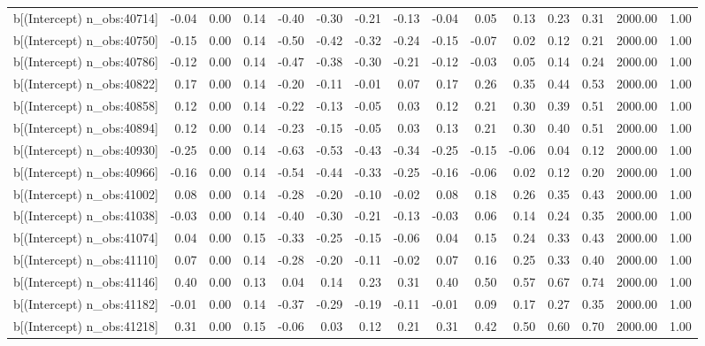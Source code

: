 \begin{table}[ht]
\begin{tabular}{rrrrrrrrrrrrrrr}
  b[(Intercept) n\_obs:40714] & -0.04 & 0.00 & 0.14 & -0.40 & -0.30 & -0.21 & -0.13 & -0.04 & 0.05 & 0.13 & 0.23 & 0.31 & 2000.00 & 1.00 \\ 
  b[(Intercept) n\_obs:40750] & -0.15 & 0.00 & 0.14 & -0.50 & -0.42 & -0.32 & -0.24 & -0.15 & -0.07 & 0.02 & 0.12 & 0.21 & 2000.00 & 1.00 \\ 
  b[(Intercept) n\_obs:40786] & -0.12 & 0.00 & 0.14 & -0.47 & -0.38 & -0.30 & -0.21 & -0.12 & -0.03 & 0.05 & 0.14 & 0.24 & 2000.00 & 1.00 \\ 
  b[(Intercept) n\_obs:40822] & 0.17 & 0.00 & 0.14 & -0.20 & -0.11 & -0.01 & 0.07 & 0.17 & 0.26 & 0.35 & 0.44 & 0.53 & 2000.00 & 1.00 \\ 
  b[(Intercept) n\_obs:40858] & 0.12 & 0.00 & 0.14 & -0.22 & -0.13 & -0.05 & 0.03 & 0.12 & 0.21 & 0.30 & 0.39 & 0.51 & 2000.00 & 1.00 \\ 
  b[(Intercept) n\_obs:40894] & 0.12 & 0.00 & 0.14 & -0.23 & -0.15 & -0.05 & 0.03 & 0.13 & 0.21 & 0.30 & 0.40 & 0.51 & 2000.00 & 1.00 \\ 
  b[(Intercept) n\_obs:40930] & -0.25 & 0.00 & 0.14 & -0.63 & -0.53 & -0.43 & -0.34 & -0.25 & -0.15 & -0.06 & 0.04 & 0.12 & 2000.00 & 1.00 \\ 
  b[(Intercept) n\_obs:40966] & -0.16 & 0.00 & 0.14 & -0.54 & -0.44 & -0.33 & -0.25 & -0.16 & -0.06 & 0.02 & 0.12 & 0.20 & 2000.00 & 1.00 \\ 
  b[(Intercept) n\_obs:41002] & 0.08 & 0.00 & 0.14 & -0.28 & -0.20 & -0.10 & -0.02 & 0.08 & 0.18 & 0.26 & 0.35 & 0.43 & 2000.00 & 1.00 \\ 
  b[(Intercept) n\_obs:41038] & -0.03 & 0.00 & 0.14 & -0.40 & -0.30 & -0.21 & -0.13 & -0.03 & 0.06 & 0.14 & 0.24 & 0.35 & 2000.00 & 1.00 \\ 
  b[(Intercept) n\_obs:41074] & 0.04 & 0.00 & 0.15 & -0.33 & -0.25 & -0.15 & -0.06 & 0.04 & 0.15 & 0.24 & 0.33 & 0.43 & 2000.00 & 1.00 \\ 
  b[(Intercept) n\_obs:41110] & 0.07 & 0.00 & 0.14 & -0.28 & -0.20 & -0.11 & -0.02 & 0.07 & 0.16 & 0.25 & 0.33 & 0.40 & 2000.00 & 1.00 \\ 
  b[(Intercept) n\_obs:41146] & 0.40 & 0.00 & 0.13 & 0.04 & 0.14 & 0.23 & 0.31 & 0.40 & 0.50 & 0.57 & 0.67 & 0.74 & 2000.00 & 1.00 \\ 
  b[(Intercept) n\_obs:41182] & -0.01 & 0.00 & 0.14 & -0.37 & -0.29 & -0.19 & -0.11 & -0.01 & 0.09 & 0.17 & 0.27 & 0.35 & 2000.00 & 1.00 \\ 
  b[(Intercept) n\_obs:41218] & 0.31 & 0.00 & 0.15 & -0.06 & 0.03 & 0.12 & 0.21 & 0.31 & 0.42 & 0.50 & 0.60 & 0.70 & 2000.00 & 1.00 \\ 

\end{tabular}
\end{table}
